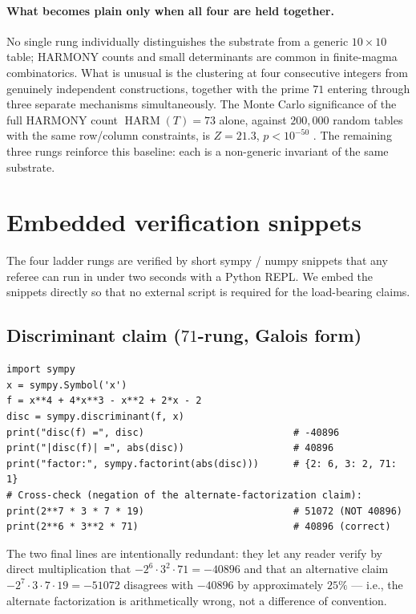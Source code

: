 \documentclass[11pt,reqno]{amsart}
\theoremstyle{definition}
\DeclareMathOperator{\HARM}{HARM}
\begin{document}
\paragraph{What becomes plain only when all four are held together.}

No single rung individually distinguishes the substrate from a
generic $10 \times 10$ table; HARMONY counts and small determinants
are common in finite-magma combinatorics. What is unusual is the
clustering at four consecutive integers from genuinely independent
constructions, together with the prime $71$ entering through three
separate mechanisms simultaneously. The Monte Carlo significance of
the full HARMONY count $\HARM(T) = 73$ alone, against $200{,}000$
random tables with the same row/column constraints, is
$Z = 21.3$, $p < 10^{-50}$ \cite{Sanders2026CLAxioms}. The remaining
three rungs reinforce this baseline: each is a non-generic invariant
of the same substrate.

\section{Embedded verification snippets}
\label{sec:verification-snippet}

The four ladder rungs are verified by short sympy / numpy snippets
that any referee can run in under two seconds with a Python REPL.
We embed the snippets directly so that no external script is required
for the load-bearing claims.

\subsection{Discriminant claim ($71$-rung, Galois form)}
\label{subsec:disc-snippet}

\begin{lstlisting}[style=plainpy]
import sympy
x = sympy.Symbol('x')
f = x**4 + 4*x**3 - x**2 + 2*x - 2
disc = sympy.discriminant(f, x)
print("disc(f) =", disc)                          # -40896
print("|disc(f)| =", abs(disc))                   # 40896
print("factor:", sympy.factorint(abs(disc)))      # {2: 6, 3: 2, 71: 1}
# Cross-check (negation of the alternate-factorization claim):
print(2**7 * 3 * 7 * 19)                          # 51072 (NOT 40896)
print(2**6 * 3**2 * 71)                           # 40896 (correct)
\end{lstlisting}

The two final lines are intentionally redundant: they let any reader
verify by direct multiplication that $-2^6 \cdot 3^2 \cdot 71 = -40896$
and that an alternative claim $-2^7 \cdot 3 \cdot 7 \cdot 19 = -51072$
disagrees with $-40896$ by approximately $25\%$ — i.e., the alternate
factorization is arithmetically wrong, not a difference of convention.
\end{document}
